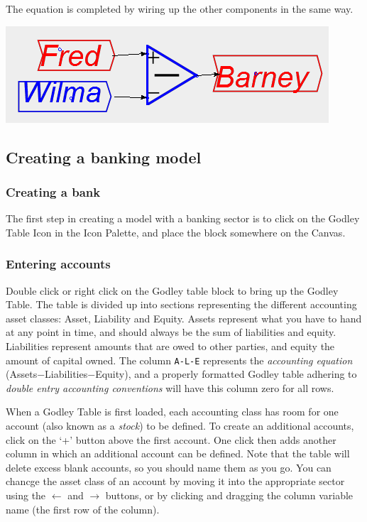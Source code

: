 The equation is completed by wiring up the other components in the
same way.
\begin{center}
\includegraphics{images/NewItem182} 
\par\end{center}

\subsection{Creating a banking model}

\label{creatingBankingModel}

\subsubsection{Creating a bank}

The first step in creating a model with a banking sector is to click
on the Godley Table Icon in the Icon Palette, and place the block
somewhere on the Canvas.

\subsubsection{Entering accounts}

Double click or right click on the Godley table block to bring up
the Godley Table. The table is divided up into sections representing
the different accounting asset classes: Asset, Liability and Equity.
Assets represent what you have to hand at any point in time, and should
always be the sum of liabilities and equity. Liabilities represent
amounts that are owed to other parties, and equity the amount of capital
owned. The column \verb+A-L-E+ represents the {\em accounting equation}
(Assets$-$Liabilities$-$Equity), and a properly formatted Godley
table adhering to {\em double entry accounting conventions} will
have this column zero for all rows.

When a Godley Table is first loaded, each accounting class has room
for one account (also known as a {\em stock}) to be defined. To
create an additional accounts, click on the `+' button above the first
account. One click then adds another column in which an additional
account can be defined. Note that the table will delete excess blank
accounts, so you should name them as you go. You can chancge the asset
class of an account by moving it into the appropriate sector using
the $\leftarrow$ and $\rightarrow$ buttons, or by clicking and dragging
the column variable name (the first row of the column).

